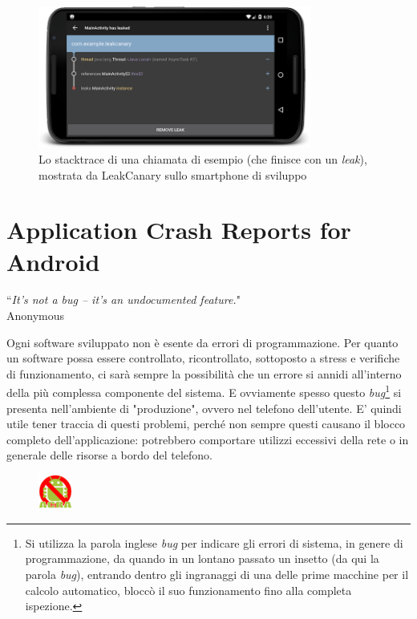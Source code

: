 \documentclass[a4paper,10pt]{memoir}
\begin{document}
\begin{figure}[ht]
\centering
\includegraphics[width=0.8\textwidth]{dev/leakcanary}
\caption{Lo stacktrace di una chiamata di esempio (che finisce con un \textit{leak}), mostrata da LeakCanary sullo smartphone di sviluppo}
\end{figure}

\clearpage

\section{Application Crash Reports for Android}

\begin{flushright}
``\textit{It's not a bug – it's an undocumented feature.}" \\ Anonymous
\end{flushright}

Ogni software sviluppato non è esente da errori di programmazione. Per quanto un software possa essere controllato, ricontrollato, sottoposto a stress e verifiche di funzionamento, ci sarà sempre la possibilità che un errore si annidi all'interno della più complessa componente del sistema. E ovviamente spesso questo \textit{bug}\footnote{Si utilizza la parola inglese \textit{bug} per indicare gli errori di sistema, in genere di programmazione, da quando in un lontano passato un insetto (da qui la parola \textit{bug}), entrando dentro gli ingranaggi di una delle prime macchine per il calcolo automatico, bloccò il suo funzionamento fino alla completa ispezione.} si presenta nell'ambiente di "produzione", ovvero nel telefono dell'utente. E' quindi utile tener traccia di questi problemi, perché non sempre questi causano il blocco completo dell'applicazione: potrebbero comportare utilizzi eccessivi della rete o in generale delle risorse a bordo del telefono.

\begin{figure}
\includegraphics[width=0.10\textwidth]{dev/ACRA}
\end{figure}
\end{document}
